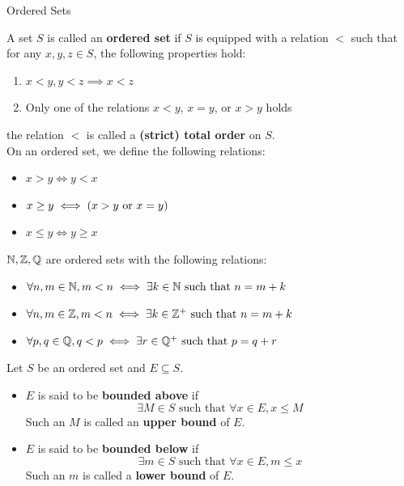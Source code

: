 \begin{section}{Ordered Sets}

A set $S$ is called an \textbf{ordered set} if $S$ is equipped with a relation $<$
such that for any $x, y, z \in S$, the following properties hold:
\begin{enumerate}[label=\textbf{(\Alph*)}]
    \item $x < y, y < z \implies x < z$
    \item Only one of the relations $x < y$, $x = y$, or $x > y$ holds
\end{enumerate}
the relation $<$ is called a \textbf{(strict) total order} on $S$.
\\[6mm]
On an ordered set, we define the following relations:
\begin{itemize}
    \item $x > y \iff y < x$
    \item $x \geq y \iff \paren*{x > y \text{ or }x = y}$
    \item $x \leq y \iff y \geq x$
\end{itemize}

\bigskip

\begin{example}
    $\N, \Z, \Q$ are ordered sets with the following relations:
    \begin{itemize}
        \item $\forall n, m \in \N, m < n \iff \exists k \in \N \text{ such that } n = m + k$
        \item $\forall n, m \in \Z, m < n \iff \exists k \in \Z^{+} \text{ such that } n = m + k$
        \item $\forall p, q \in \Q, q < p \iff \exists r \in \Q^{+} \text{ such that } p = q + r$
    \end{itemize}
\end{example}

\bigskip

\begin{definition} \label{def:Boundedness}
    Let $S$ be an ordered set and $E \subseteq S$.
    \begin{itemize}
        \item $E$ is said to be \textbf{bounded above} if
        \[
        \exists M \in S \text{ such that } \forall  x \in E, x \leq M
        \]
        Such an $M$ is called an \textbf{upper bound} of $E$.
        \item $E$ is said to be \textbf{bounded below} if
        \[
        \exists m \in S \text{ such that } \forall  x \in E, m \leq x
        \]
        Such an $m$ is called a \textbf{lower bound} of $E$.
    \end{itemize}
\end{definition}


\end{section}

